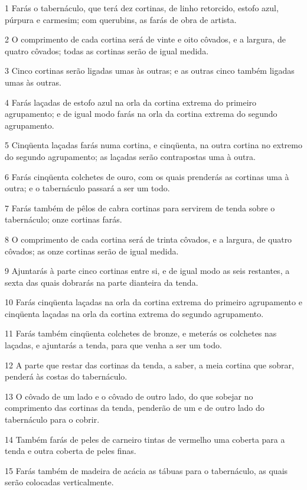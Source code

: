 \par 1 Farás o tabernáculo, que terá dez cortinas, de linho retorcido, estofo azul, púrpura e carmesim; com querubins, as farás de obra de artista.
\par 2 O comprimento de cada cortina será de vinte e oito côvados, e a largura, de quatro côvados; todas as cortinas serão de igual medida.
\par 3 Cinco cortinas serão ligadas umas às outras; e as outras cinco também ligadas umas às outras.
\par 4 Farás laçadas de estofo azul na orla da cortina extrema do primeiro agrupamento; e de igual modo farás na orla da cortina extrema do segundo agrupamento.
\par 5 Cinqüenta laçadas farás numa cortina, e cinqüenta, na outra cortina no extremo do segundo agrupamento; as laçadas serão contrapostas uma à outra.
\par 6 Farás cinqüenta colchetes de ouro, com os quais prenderás as cortinas uma à outra; e o tabernáculo passará a ser um todo.
\par 7 Farás também de pêlos de cabra cortinas para servirem de tenda sobre o tabernáculo; onze cortinas farás.
\par 8 O comprimento de cada cortina será de trinta côvados, e a largura, de quatro côvados; as onze cortinas serão de igual medida.
\par 9 Ajuntarás à parte cinco cortinas entre si, e de igual modo as seis restantes, a sexta das quais dobrarás na parte dianteira da tenda.
\par 10 Farás cinqüenta laçadas na orla da cortina extrema do primeiro agrupamento e cinqüenta laçadas na orla da cortina extrema do segundo agrupamento.
\par 11 Farás também cinqüenta colchetes de bronze, e meterás os colchetes nas laçadas, e ajuntarás a tenda, para que venha a ser um todo.
\par 12 A parte que restar das cortinas da tenda, a saber, a meia cortina que sobrar, penderá às costas do tabernáculo.
\par 13 O côvado de um lado e o côvado de outro lado, do que sobejar no comprimento das cortinas da tenda, penderão de um e de outro lado do tabernáculo para o cobrir.
\par 14 Também farás de peles de carneiro tintas de vermelho uma coberta para a tenda e outra coberta de peles finas.
\par 15 Farás também de madeira de acácia as tábuas para o tabernáculo, as quais serão colocadas verticalmente.
